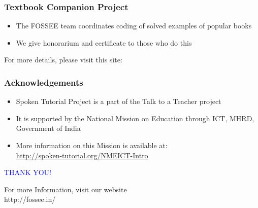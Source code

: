 \documentclass[17pt]{beamer}
\begin{document}
\begin{frame}
\frametitle{Textbook Companion Project}
\begin{itemize}
\item The FOSSEE team coordinates coding of solved examples of popular
  books 
\item We give honorarium and certificate to those who do this
\end{itemize}
For more details, please visit this site:
\begin{center}
{\color{blue}{http://tbc-python.fossee.in/}}
\end{center}
\end{frame}
\begin{frame}
\frametitle{Acknowledgements}
\begin{itemize}
\item Spoken Tutorial Project is a part of the Talk to a Teacher  project 
\item It is supported by the National Mission on Education through  ICT, MHRD, Government of India 
\item More information on this Mission is available at: \\{\color{blue}\url{http://spoken-tutorial.org/NMEICT-Intro}}
\end{itemize}
\end{frame}
\begin{frame}

  \begin{block}{}
  \begin{center}
  \textcolor{blue}{\Large THANK YOU!} 
  \end{center}
  \end{block}
\begin{block}{}
  \begin{center}
    For more Information, visit our website\\
    {http://fossee.in/}
  \end{center}  
  \end{block}
\end{frame}
\end{document}
